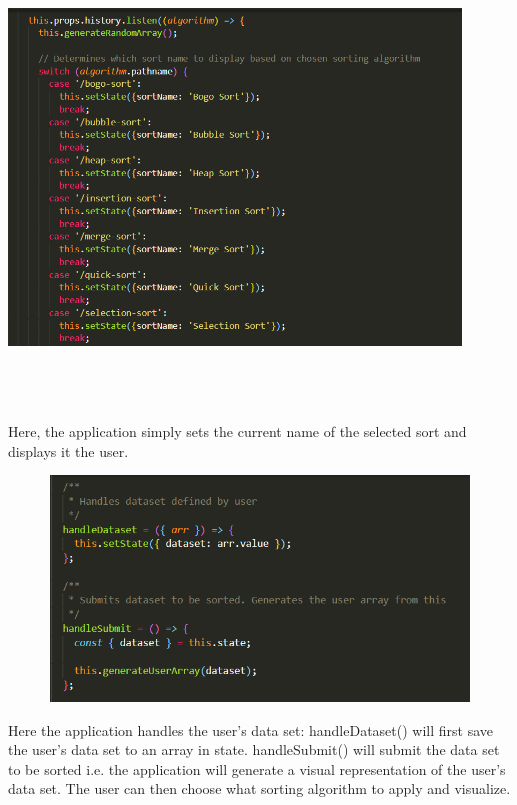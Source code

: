 \begin{center}
    \includegraphics[width=12cm,height=12cm,keepaspectratio]{images/mainpage2}
\end{center}
Here, the application simply sets the current name of the selected sort and displays it the user.

\begin{center}
    \includegraphics[width=15cm,height=6cm,keepaspectratio]{images/mainpage3}
\end{center}
Here the application handles the user's data set: handleDataset() will first save the user's data set to an array in state. handleSubmit() will submit the data set to be sorted i.e. the application will generate a visual representation of the user's data set. The user can then choose what sorting algorithm to apply and visualize.

